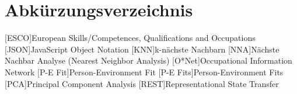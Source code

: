 \renewcommand{\chaptermark}[1]{\markboth{\spacedlowsmallcaps{#1}}{\spacedlowsmallcaps{#1}}}
\renewcommand{\sectionmark}[1]{\markright{\thesection\enspace\spacedlowsmallcaps{#1}}}
\chapter*{Abk\"{u}rzungsverzeichnis}

\begin{acronym}[UML]
  [ESCO]{European Skills/Competences, Qualifications and Occupations}
  [JSON]{JavaScript Object Notation}
  [KNN]{k-nächste Nachbarn}
  [NNA]{Nächste Nachbar Analyse (Nearest Neighbor Analysis)}
  [O*Net]{Occupational Information Network}
  [P-E Fit]{Person-Environment Fit}
  [P-E Fits]{Person-Environment Fits}
  [PCA]{Principal Component Analysis}
  [REST]{Representational State Transfer}
\end{acronym}

\cleardoublepage
